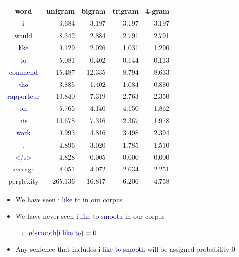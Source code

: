\documentclass[landscape]{slides}
\newcommand{\example}[1]{\textcolor{darkblue}{\rm #1}}
\newcommand{\maths}[1]{\textcolor{purple}{#1}}
\begin{document}

\vspace{-1mm}
\begin{center}
\begin{tabular}{c|r|r|r|r} 
word & unigram & bigram & trigram & 4-gram \\ \hline \hline
\example{i}           & 6.684 & 3.197 & 3.197 & 3.197\\ \hline
\example{would}       & 8.342 & 2.884 & 2.791 & 2.791\\ \hline
\example{like}        & 9.129 & 2.026 & 1.031 & 1.290\\ \hline
\example{to}          & 5.081 & 0.402 & 0.144 & 0.113\\ \hline
\example{commend}     &15.487 &12.335 & 8.794 & 8.633\\ \hline
\example{the}         & 3.885 & 1.402 & 1.084 & 0.880\\ \hline
\example{rapporteur}  &10.840 & 7.319 & 2.763 & 2.350\\ \hline
\example{on}          & 6.765 & 4.140 & 4.150 & 1.862\\ \hline
\example{his}         &10.678 & 7.316 & 2.367 & 1.978\\ \hline
\example{work}        & 9.993 & 4.816 & 3.498 & 2.394\\ \hline
\example{.}           & 4.896 & 3.020 & 1.785 & 1.510\\ \hline
\example{\textless /s\textgreater}  & 4.828 & 0.005 & 0.000 & 0.000\\ \hline \hline
average          & 8.051  & 4.072 & 2.634  & 2.251 \\ \hline
perplexity       & 265.136 & 16.817 & 6.206 & 4.758\\
\end{tabular}
\end{center}


\vspace{20mm}
\begin{itemize}
\item We have seen \example{i like to} in our corpus
\item We have never seen \example{i like to smooth} in our corpus
\item[$\rightarrow$] \maths{$p(\text{\example{smooth}}|\text{\example{i like to}}) = 0$}
\vspace{10mm}
\item Any sentence that includes \example{i like to smooth} will be assigned probability 0
\end{itemize}
\end{document}
